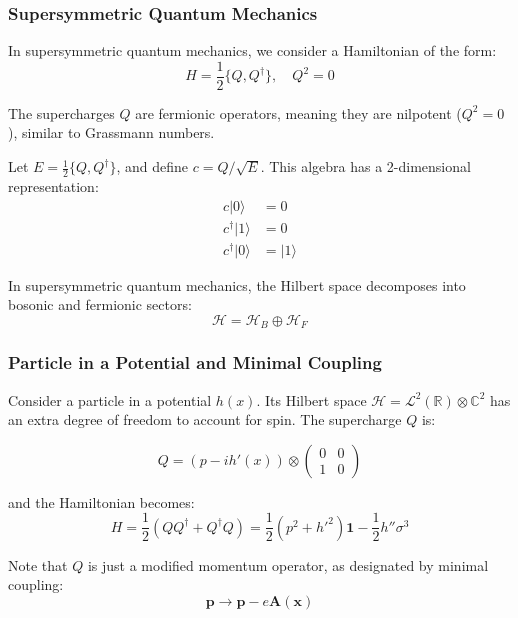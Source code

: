 \subsubsection{Supersymmetric Quantum Mechanics}

In supersymmetric quantum mechanics, we consider a Hamiltonian of the form:
\begin{equation}
H = \frac{1}{2} \{Q, Q^{\dagger} \}, \quad Q^2 = 0
\end{equation}

The supercharges $Q$ are fermionic operators, meaning they are nilpotent ($Q^2 = 0$), similar to Grassmann numbers.

Let $E = \frac{1}{2} \{Q, Q^{\dagger} \}$, and define $c = Q/\sqrt{E}$. This algebra has a 2-dimensional representation:
\begin{align}
c |0\rangle &= 0 \\
c^{\dagger} |1\rangle &= 0 \\
c^{\dagger} |0\rangle &= |1\rangle
\end{align}

In supersymmetric quantum mechanics, the Hilbert space decomposes into bosonic and fermionic sectors:
\begin{equation}
\mathcal{H} = \mathcal{H}_{B} \oplus \mathcal{H}_{F}
\end{equation}

\subsubsection{Particle in a Potential and Minimal Coupling}

Consider a particle in a potential $h(x)$. Its Hilbert space $\mathcal{H} = \mathcal{L}^2(\mathbb{R}) \otimes \mathbb{C}^{2}$ has an extra degree of freedom to account for spin. The supercharge $Q$ is:

\begin{equation}
Q = (p - ih'(x)) \otimes \begin{pmatrix} 0 & 0 \\ 1 & 0 \end{pmatrix}
\end{equation}

and the Hamiltonian becomes:
\begin{equation}
H = \frac{1}{2}(QQ^{\dagger} + Q^{\dagger}Q) = \frac{1}{2}(p^2 + h'^2) \mathbf{1} - \frac{1}{2}h'' \sigma^3
\end{equation}

Note that $Q$ is just a modified momentum operator, as designated by minimal coupling:
\begin{equation}
\mathbf{p} \rightarrow \mathbf{p} - e\mathbf{A}(\mathbf{x})
\end{equation}

